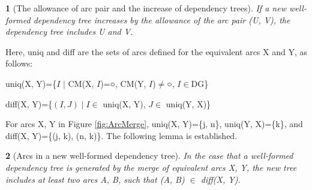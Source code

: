 \documentclass[english]{jnlp_1.4_rep}
\theoremstyle{break}
\theoremstyle{plain}
\newtheorem{lemma}{}[]
\newcommand{\proof}[1]{}
\theoremstyle{plain}
\begin{document}
\begin{lemma}[The allowance of arc pair and the increase of dependency trees]
\label{lem:ArcPairAndNewTree}
If a 
\linebreak
new well-formed dependency tree increases by the allowance of the arc pair (U, V), the dependency tree includes U and V.

\proof{This lemma is obvious because well-formed dependency trees in DG', which include neither U nor V, exist in DG.\\
}
\end{lemma}

\noindent
Here, uniq and diff are the sets of arcs defined for the
equivalent arcs X and Y, as follows:

uniq(X, Y)=\{$I$ ${\mid}$ CM(X, $I$)=○, CM(Y, $I$)${\neq}$○, $I{\in}$DG\}

diff(X, Y)=\{$(I, J) \mid I \in$ uniq(X, Y), $J \in$ uniq(Y, X)\}

\noindent
For arcs X, Y in Figure \ref{fig:ArcMerge},
uniq(X, Y)=\{j, n\}, uniq(Y, X)=\{k\}, and diff(X, Y)=\{(j, k), (n, k)\}. The
following lemma is established.

\begin{lemma} [Arcs in a new well-formed dependency tree]
\label{lem:ArcsInNewTree}
In the case that a well-formed dependency tree is generated by the
merge of equivalent arcs X, Y, the new tree includes at least two
arcs A, B, such that (A, B) ${\in}$ diff(X, Y).

\proof{
Let DF and DF' be the dependency forests before and after the merge of
X and Y. Assume that a new dependency tree DT$_x$ is obtained by the
allowance of the arc pair (X, B$_i$) caused by the merge of X and Y.
X and B$_i$ are included in DT$_x$, according to Lemma
\ref{lem:ArcPairAndNewTree}. Here, let
R$=$DT$_x-$\{X, B$_i$\}. CM(X, U)$=$○ wrt DF', CM(B$_i$, U)=○ wrt DF'
for U${\in}$R, because DT$_x$ is a well-formed dependency tree.

Assuming that there is no arc U such that CM(Y, U)${\neq}$○ wrt DF
(i.e., CM(Y, U)$=$○ wrt DF, U${\in}$R), DT$_y$=\{Y, B$_i$\}+R is a
well-formed dependency tree in DF. DT$_x$ is not a new generalized
dependency tree because DT$_x$ and DT$_y$ differ only in equivalent
arc X and Y, i.e., DT$_x$ and DT$_y$ are equivalent. Therefore, DT$_x$
must include at least one U$_i$, such that CM(Y, U$_i$)${\neq}$○ wrt
DF is a new generalized dependency tree. This lemma is established
because (B$_i$, U$_i$)${\in}$diff(X, Y).   }
\end{lemma}
\end{document}
